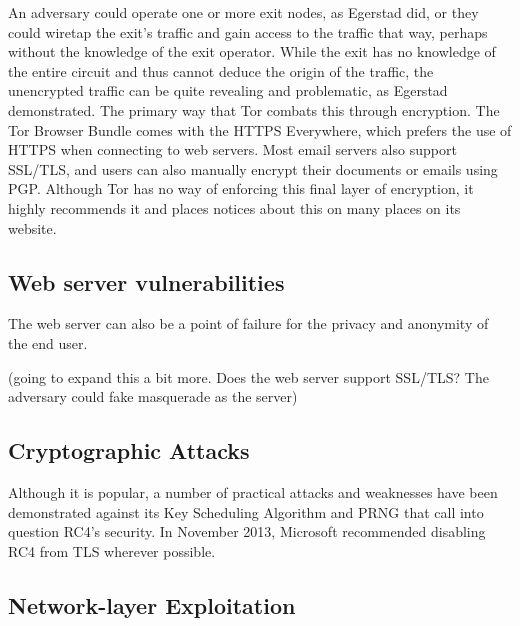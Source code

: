 \documentclass[journal]{IEEEtran}
\begin{document}
An adversary could operate one or more exit nodes, as Egerstad did, or they could wiretap the exit's traffic and gain access to the traffic that way, perhaps without the knowledge of the exit operator. While the exit has no knowledge of the entire circuit and thus cannot deduce the origin of the traffic, the unencrypted traffic can be quite revealing and problematic, as Egerstad demonstrated. The primary way that Tor combats this through encryption. The Tor Browser Bundle comes with the HTTPS Everywhere, which prefers the use of HTTPS when connecting to web servers. Most email servers also support SSL/TLS, and users can also manually encrypt their documents or emails using PGP. Although Tor has no way of enforcing this final layer of encryption, it highly recommends it and places notices about this on many places on its website.

\subsection{Web server vulnerabilities}

The web server can also be a point of failure for the privacy and anonymity of the end user.

(going to expand this a bit more. Does the web server support SSL/TLS? The adversary could fake masquerade as the server)

\subsection{Cryptographic Attacks}

Although it is popular, a number of practical attacks and weaknesses have been demonstrated against its Key Scheduling Algorithm and PRNG that call into question RC4's security. In November 2013, Microsoft recommended disabling RC4 from TLS wherever possible.

\subsection{Network-layer Exploitation}
\end{document}
